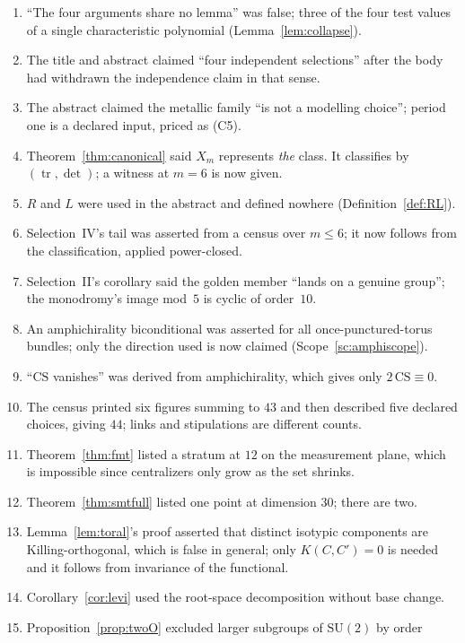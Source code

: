 \documentclass[11pt,reqno]{amsart}
\theoremstyle{plain}
\theoremstyle{definition}
\theoremstyle{remark}
\newcommand{\SU}{\mathrm{SU}}
\newcommand{\tr}{\operatorname{tr}}
\begin{document}
\begin{enumerate}[leftmargin=2.2em,itemsep=1pt]
\item ``The four arguments share no lemma'' was false; three of the four test values of a
  single characteristic polynomial (Lemma~\ref{lem:collapse}).
\item The title and abstract claimed ``four independent selections'' after the body had
  withdrawn the independence claim in that sense.
\item The abstract claimed the metallic family ``is not a modelling choice''; period one
  is a declared input, priced as (C5).
\item Theorem~\ref{thm:canonical} said $X_m$ represents \emph{the} class. It classifies
  by $(\tr,\det)$; a witness at $m=6$ is now given.
\item $R$ and $L$ were used in the abstract and defined nowhere (Definition~\ref{def:RL}).
\item Selection~IV's tail was asserted from a census over $m\le6$; it now follows from
  the classification, applied power-closed.
\item Selection~II's corollary said the golden member ``lands on a genuine group''; the
  monodromy's image mod~$5$ is cyclic of order~$10$.
\item An amphichirality biconditional was asserted for all once-punctured-torus bundles;
  only the direction used is now claimed (Scope~\ref{sc:amphiscope}).
\item ``$\mathrm{CS}$ vanishes'' was derived from amphichirality, which gives only
  $2\,\mathrm{CS}\equiv0$.
\item The census printed six figures summing to $43$ and then described five declared
  choices, giving $44$; links and stipulations are different counts.
\item Theorem~\ref{thm:fmt} listed a stratum at $12$ on the measurement plane, which is
  impossible since centralizers only grow as the set shrinks.
\item Theorem~\ref{thm:smtfull} listed one point at dimension $30$; there are two.
\item Lemma~\ref{lem:toral}'s proof asserted that distinct isotypic components are
  Killing-orthogonal, which is false in general; only $K(C,C')=0$ is needed and it
  follows from invariance of the functional.
\item Corollary~\ref{cor:levi} used the root-space decomposition without base change.
\item Proposition~\ref{prop:twoO} excluded larger subgroups of $\SU(2)$ by order

\end{enumerate}
\end{document}
